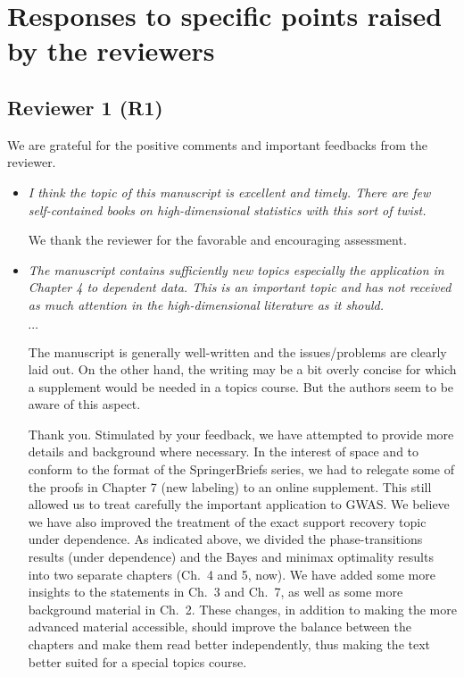 \documentclass[11pt]{article}
\begin{document}
 
 \section{Responses to specific points raised by the reviewers}
 
 \subsection{Reviewer 1 (R1)}
 
 We are grateful for the positive comments and important feedbacks from the reviewer. 
 
 \begin{itemize}
  \item {\em I think the topic of this manuscript is excellent and timely. There are few self-contained books on high-dimensional statistics with this sort of twist.}
  
  We thank the reviewer for the favorable and encouraging assessment.  
  
  \item {\em  The manuscript contains sufficiently new topics especially the application in Chapter 4 to dependent data. This is an important topic and has not received as much attention in the high-dimensional literature as it should.
  
  \centerline{$\cdots$}
  
  The manuscript is generally well-written and the issues/problems are clearly laid out. On the other hand, the writing may be a bit overly concise for which a supplement would be needed in a topics course. But the authors seem to be aware of this aspect.}
  
  Thank you.  Stimulated by your feedback, we have attempted to provide more details and background where necessary.  In the interest of space and to 
  conform to the format of the SpringerBriefs series, we had to relegate some of the proofs in Chapter 7 (new labeling) to an online supplement.  This still 
  allowed us to treat carefully the important application to GWAS.  We believe we have also improved the treatment of the exact support recovery topic under 
  dependence.  As indicated above, we divided the phase-transitions results (under dependence) and the Bayes and minimax optimality results into 
  two separate chapters (Ch.\ 4 and 5, now).   We have added some more insights to the statements in Ch.\ 3 and Ch.\ 7, as well as some more 
  background material in Ch.\ 2.  
  These changes, in addition to making the more advanced material accessible, should improve the balance between the chapters and make them read better independently, thus making the text better suited for a special topics course.
 
  \end{itemize}
  
\end{document}
